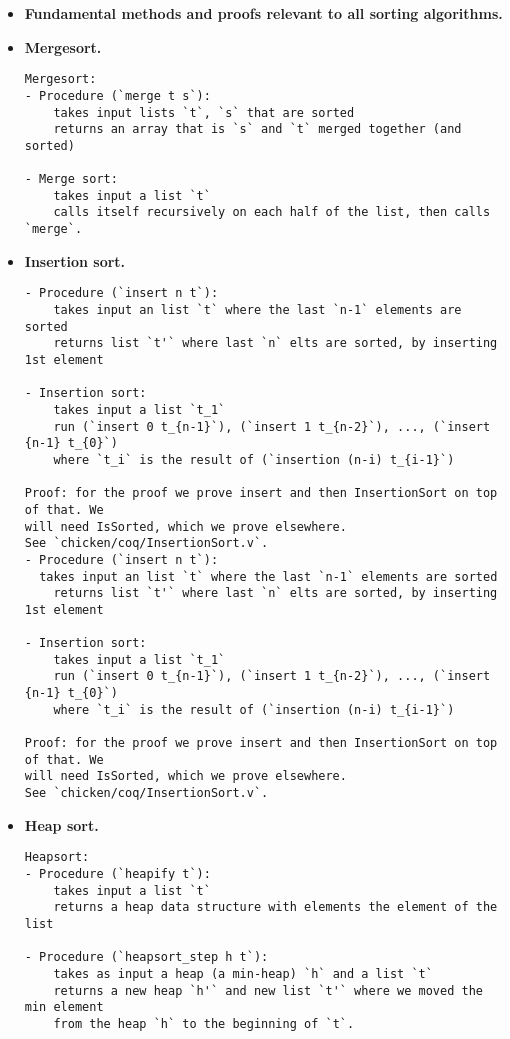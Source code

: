 \documentclass{article}
\begin{document}
\begin{itemize}
  \item \textbf{Fundamental methods and proofs relevant to all
                sorting algorithms.}
  \item \textbf{Mergesort.}
\begin{verbatim}
Mergesort:
- Procedure (`merge t s`): 
	takes input lists `t`, `s` that are sorted
	returns an array that is `s` and `t` merged together (and sorted)

- Merge sort: 
	takes input a list `t`
	calls itself recursively on each half of the list, then calls `merge`.

\end{verbatim}

  \item \textbf{Insertion sort.}
\begin{verbatim}
- Procedure (`insert n t`): 
	takes input an list `t` where the last `n-1` elements are sorted
	returns list `t'` where last `n` elts are sorted, by inserting 1st element 

- Insertion sort:
	takes input a list `t_1`
	run (`insert 0 t_{n-1}`), (`insert 1 t_{n-2}`), ..., (`insert {n-1} t_{0}`)
	where `t_i` is the result of (`insertion (n-i) t_{i-1}`)
	
Proof: for the proof we prove insert and then InsertionSort on top of that. We
will need IsSorted, which we prove elsewhere.
See `chicken/coq/InsertionSort.v`.
- Procedure (`insert n t`): 
  takes input an list `t` where the last `n-1` elements are sorted
	returns list `t'` where last `n` elts are sorted, by inserting 1st element 

- Insertion sort:
	takes input a list `t_1`
	run (`insert 0 t_{n-1}`), (`insert 1 t_{n-2}`), ..., (`insert {n-1} t_{0}`)
	where `t_i` is the result of (`insertion (n-i) t_{i-1}`)
	
Proof: for the proof we prove insert and then InsertionSort on top of that. We
will need IsSorted, which we prove elsewhere.
See `chicken/coq/InsertionSort.v`.
\end{verbatim}

  \item \textbf{Heap sort.}
\begin{verbatim}
Heapsort:
- Procedure (`heapify t`):
	takes input a list `t`
	returns a heap data structure with elements the element of the list

- Procedure (`heapsort_step h t`):
	takes as input a heap (a min-heap) `h` and a list `t`
	returns a new heap `h'` and new list `t'` where we moved the min element
	from the heap `h` to the beginning of `t`.


\end{verbatim}
\end{itemize}
\end{document}
